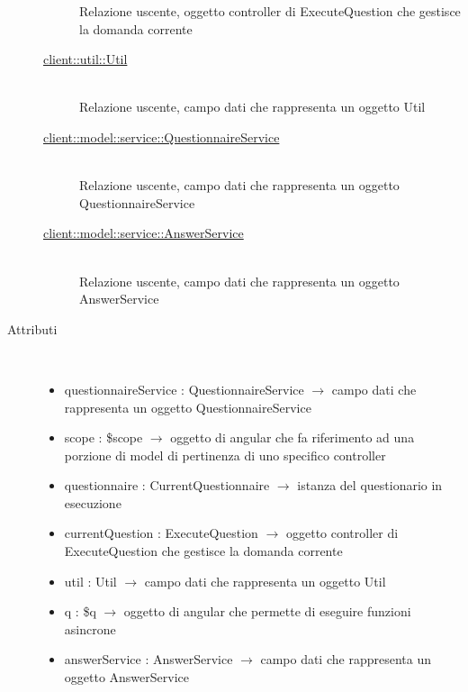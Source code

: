 \begin{description}
\begin{description}
	Relazione uscente, oggetto controller di ExecuteQuestion che gestisce la domanda corrente
	\item[\hyperlink{client::util::Util}{client::util::Util}] \hfill \\
	Relazione uscente, campo dati che rappresenta un oggetto Util
	\item[\hyperlink{client::model::service::QuestionnaireService}{client::model::service::QuestionnaireService}] \hfill \\
	Relazione uscente, campo dati che rappresenta un oggetto QuestionnaireService
	\item[\hyperlink{client::model::service::AnswerService}{client::model::service::AnswerService}] \hfill \\
	Relazione uscente, campo dati che rappresenta un oggetto AnswerService	
\end{description}

\item[Attributi] \hfill \\
\vspace{-7mm}
\begin{itemize}
	\item questionnaireService : QuestionnaireService $\rightarrow$ campo dati che rappresenta un oggetto QuestionnaireService
	\item scope : \$scope $\rightarrow$ oggetto di angular che fa riferimento ad una porzione di model di pertinenza di uno specifico controller
	\item questionnaire : CurrentQuestionnaire $\rightarrow$ istanza del questionario in esecuzione
	\item currentQuestion : ExecuteQuestion $\rightarrow$ oggetto controller di ExecuteQuestion che gestisce la domanda corrente
	\item util : Util $\rightarrow$ campo dati che rappresenta un oggetto Util
	\item q : \$q $\rightarrow$ oggetto di angular che permette di eseguire funzioni asincrone
	\item answerService : AnswerService $\rightarrow$ campo dati che rappresenta un oggetto AnswerService	
\end{itemize}


\end{description}
